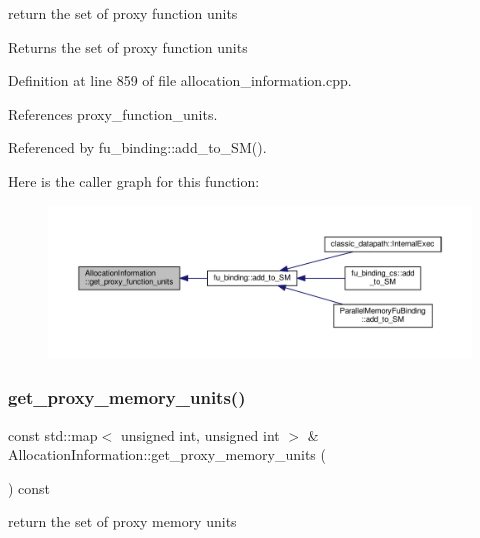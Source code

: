 return the set of proxy function units 

\begin{DoxyReturn}{Returns}
the set of proxy function units 
\end{DoxyReturn}


Definition at line 859 of file allocation\+\_\+information.\+cpp.



References proxy\+\_\+function\+\_\+units.



Referenced by fu\+\_\+binding\+::add\+\_\+to\+\_\+\+S\+M().

Here is the caller graph for this function\+:
\nopagebreak
\begin{figure}[H]
\begin{center}
\leavevmode
\includegraphics[width=350pt]{d7/d79/classAllocationInformation_ad313cb16811effed12da7bee69c9b16d_icgraph}
\end{center}
\end{figure}
\mbox{\label{classAllocationInformation_afb4a53f5f1daeffafcacd5a2a821234c}} 
\subsubsection{\texorpdfstring{get\+\_\+proxy\+\_\+memory\+\_\+units()}{get\_proxy\_memory\_units()}}
{\footnotesize\ttfamily const std\+::map$<$ unsigned int, unsigned int $>$ \& Allocation\+Information\+::get\+\_\+proxy\+\_\+memory\+\_\+units (\begin{DoxyParamCaption}{ }\end{DoxyParamCaption}) const}



return the set of proxy memory units 

